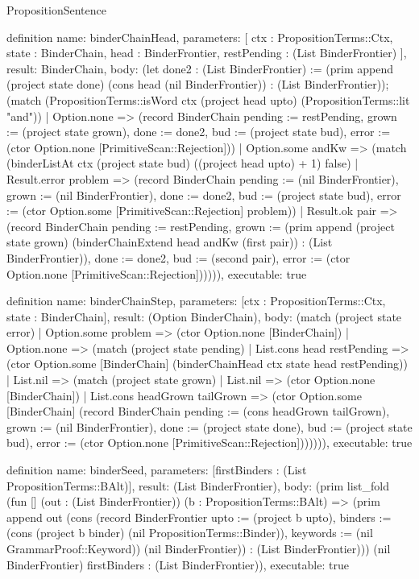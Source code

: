 \begin{lexlean}{PropositionSentence}
\begin{semanticmodule}
definition{
  name: binderChainHead,
  parameters: [
    ctx : PropositionTerms::Ctx,
    state : BinderChain,
    head : BinderFrontier,
    restPending : (List BinderFrontier)
  ],
  result: BinderChain,
  body: (let done2 : (List BinderFrontier) := (prim append (project state done) (cons head (nil BinderFrontier)) : (List BinderFrontier)); (match (PropositionTerms::isWord ctx (project head upto) (PropositionTerms::lit "and"))
    | Option.none => (record BinderChain {pending := restPending, grown := (project state grown), done := done2, bud := (project state bud), error := (ctor Option.none [PrimitiveScan::Rejection])})
    | Option.some andKw => (match (binderListAt ctx (project state bud) ((project head upto) + 1) false)
        | Result.error problem => (record BinderChain {pending := (nil BinderFrontier), grown := (nil BinderFrontier), done := done2, bud := (project state bud), error := (ctor Option.some [PrimitiveScan::Rejection] problem)})
        | Result.ok pair => (record BinderChain {pending := restPending, grown := (prim append (project state grown) (binderChainExtend head andKw (first pair)) : (List BinderFrontier)), done := done2, bud := (second pair), error := (ctor Option.none [PrimitiveScan::Rejection])})))),
  executable: true
}

definition{
  name: binderChainStep,
  parameters: [ctx : PropositionTerms::Ctx, state : BinderChain],
  result: (Option BinderChain),
  body: (match (project state error)
    | Option.some problem => (ctor Option.none [BinderChain])
    | Option.none => (match (project state pending)
      | List.cons head restPending => (ctor Option.some [BinderChain] (binderChainHead ctx state head restPending))
      | List.nil => (match (project state grown)
          | List.nil => (ctor Option.none [BinderChain])
          | List.cons headGrown tailGrown => (ctor Option.some [BinderChain] (record BinderChain {pending := (cons headGrown tailGrown), grown := (nil BinderFrontier), done := (project state done), bud := (project state bud), error := (ctor Option.none [PrimitiveScan::Rejection])}))))),
  executable: true
}

definition{
  name: binderSeed,
  parameters: [firstBinders : (List PropositionTerms::BAlt)],
  result: (List BinderFrontier),
  body: (prim list_fold (fun [] (out : (List BinderFrontier)) (b : PropositionTerms::BAlt) => (prim append out (cons (record BinderFrontier {upto := (project b upto), binders := (cons (project b binder) (nil PropositionTerms::Binder)), keywords := (nil GrammarProof::Keyword)}) (nil BinderFrontier)) : (List BinderFrontier))) (nil BinderFrontier) firstBinders : (List BinderFrontier)),
  executable: true
}


\end{semanticmodule}
\end{lexlean}
